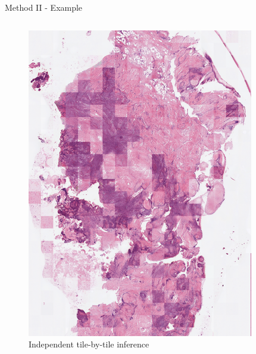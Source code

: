\documentclass[t]{beamer}
\begin{document}
\begin{frame}{Method II - Example}

\begin{columns}

\begin{column}{0.5\textwidth}
\begin{figure}
\centering
\includegraphics[width=0.75\linewidth]{scan6-independent}
\caption{Independent tile-by-tile inference}
\end{figure}
\end{column}


\end{columns}
\end{frame}
\end{document}
